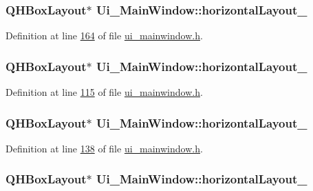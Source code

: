 \hypertarget{a00027_a9403b9a7c13814220caeb1748ef9e672}{
\subsubsection[{horizontal\+Layout\+\_\+24}]{\setlength{\rightskip}{0pt plus 5cm}Q\+H\+Box\+Layout$\ast$ Ui\+\_\+\+Main\+Window\+::horizontal\+Layout\+\_}}\label{a00027_a9403b9a7c13814220caeb1748ef9e672}


Definition at line \hyperlink{a00052_source_l00164}{164} of file \hyperlink{a00052_source}{ui\+\_\+mainwindow.\+h}.

\hypertarget{a00027_a488ae2286c0922552e7a39a756e337d3}{
\subsubsection[{horizontal\+Layout\+\_\+25}]{\setlength{\rightskip}{0pt plus 5cm}Q\+H\+Box\+Layout$\ast$ Ui\+\_\+\+Main\+Window\+::horizontal\+Layout\+\_}}\label{a00027_a488ae2286c0922552e7a39a756e337d3}


Definition at line \hyperlink{a00052_source_l00115}{115} of file \hyperlink{a00052_source}{ui\+\_\+mainwindow.\+h}.

\hypertarget{a00027_afb4ab27a4cd626c64c34ab3651fa8413}{
\subsubsection[{horizontal\+Layout\+\_\+26}]{\setlength{\rightskip}{0pt plus 5cm}Q\+H\+Box\+Layout$\ast$ Ui\+\_\+\+Main\+Window\+::horizontal\+Layout\+\_}}\label{a00027_afb4ab27a4cd626c64c34ab3651fa8413}


Definition at line \hyperlink{a00052_source_l00138}{138} of file \hyperlink{a00052_source}{ui\+\_\+mainwindow.\+h}.

\hypertarget{a00027_acbfe65f9d2895246b00c82c815b5369e}{
\subsubsection[{horizontal\+Layout\+\_\+27}]{\setlength{\rightskip}{0pt plus 5cm}Q\+H\+Box\+Layout$\ast$ Ui\+\_\+\+Main\+Window\+::horizontal\+Layout\+\_}}\label{a00027_acbfe65f9d2895246b00c82c815b5369e}


